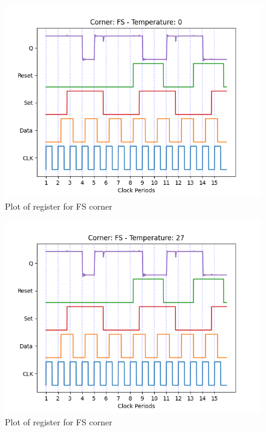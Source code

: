 \begin{figure}[H]
    \centering
    \includegraphics[width=\textwidth]{Figures/Aimspice_Plots/FS_0.png}
    \caption{Plot of register for FS corner}
    \label{fig:FS0}
\end{figure}

\begin{figure}[H]
    \centering
    \includegraphics[width=\textwidth]{Figures/Aimspice_Plots/FS_27.png}
    \caption{Plot of register for FS corner}
    \label{fig:FS27}
\end{figure}

